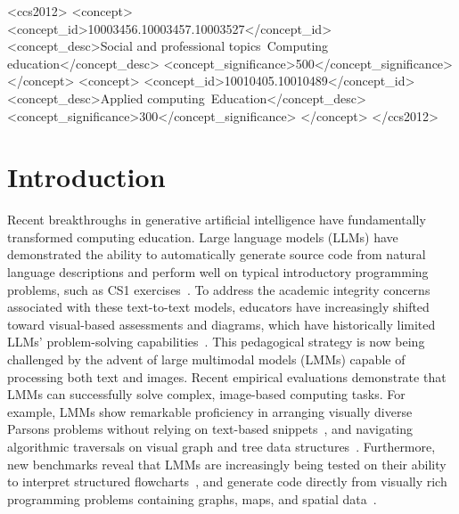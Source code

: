 \documentclass[sigconf, nonacm]{acmart}
\begin{document}
\begin{CCSXML}
<ccs2012>
   <concept>
       <concept_id>10003456.10003457.10003527</concept_id>
       <concept_desc>Social and professional topics~Computing education</concept_desc>
       <concept_significance>500</concept_significance>
   </concept>
   <concept>
       <concept_id>10010405.10010489</concept_id>
       <concept_desc>Applied computing~Education</concept_desc>
       <concept_significance>300</concept_significance>
   </concept>
</ccs2012>
\end{CCSXML}


\maketitle

\section{Introduction}
Recent breakthroughs in generative artificial intelligence have fundamentally transformed computing education. 
Large language models (LLMs) have demonstrated the ability to automatically 
generate source code from natural language descriptions and perform well on typical 
introductory programming problems, such as CS1 exercises~\cite{denny2023conversing}. 
To address the academic integrity concerns associated with these text-to-text models, 
educators have increasingly shifted toward visual-based assessments and diagrams, 
which have historically limited LLMs' problem-solving capabilities~\cite{gutierrez2024seeing}.
This pedagogical strategy is now being challenged by the advent of large multimodal models 
(LMMs) capable of processing both text and images. Recent empirical evaluations demonstrate 
that LMMs can successfully solve complex, image-based computing tasks. For example, LMMs show 
remarkable proficiency in arranging visually diverse Parsons problems without relying on text-based 
snippets~\cite{hou2024more}, and navigating algorithmic traversals on visual graph and 
tree data structures~\cite{gutierrez2024seeing}. Furthermore, new benchmarks reveal that 
LMMs are increasingly being tested on their ability to interpret structured flowcharts~\cite{singh2024flowvqa}, 
and generate code directly from visually rich programming problems containing graphs, maps, and spatial data~\cite{li2024mmcode}.
\end{document}

